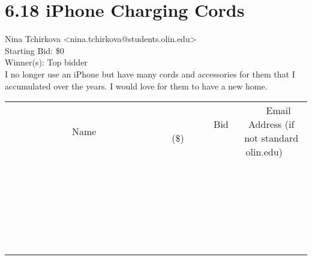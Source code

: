\documentclass[11pt]{article}
\begin{document}
					\section*{6.18 iPhone Charging Cords}
					Nina Tchirkova <nina.tchirkova@students.olin.edu> \\
					Starting Bid: \$0 \\
					Winner(s): Top bidder \\
					I no longer use an iPhone but have many cords and accessories for them that I accumulated over the years. I would love for them to have a new home. \\
					[6ex]
					\begin{tabular}{c c c}
						~~~~~~~~~~~~~Name~~~~~~~~~~~~~ & ~~~~~~~~~Bid (\$)~~~~~~~~~ & ~~~Email Address (if not standard olin.edu)~~~ \\
				
 & & \\
\hline
 & & \\
\hline
 & & \\
\hline
 & & \\
\hline
 & & \\
\hline
 & & \\
\hline
 & & \\
\hline
 & & \\
\hline
 & & \\
\hline
 & & \\
\hline
 & & \\
\hline
 & & \\
\hline
 & & \\
\hline
 & & \\
\hline
 & & \\
\hline
 & & \\
\hline
 & & \\
\hline
 & & \\
\hline
 & & \\
\hline
 & & \\
\hline
 & & \\
\hline
 & & \\
\hline
 & & \\
\hline
 & & \\
\hline
 & & \\
\hline
 & & \\
\hline
					\end{tabular}
					\clearpage
				
\end{document}
